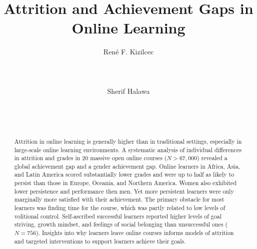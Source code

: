 \documentclass{sigchi}\usepackage[]{graphicx}\usepackage[]{color}
\begin{document}
\title{Attrition and Achievement Gaps in Online Learning}

\author{
  \alignauthor Ren\'{e} F. Kizilcec\\
    \\
    \\
    \\
  \alignauthor Sherif Halawa\\
    \\
    \\
    \\
}

\maketitle

\begin{abstract}
Attrition in online learning is generally higher than in traditional settings, especially in large-scale online learning environments. A systematic analysis of individual differences in attrition and grades in 20 massive open online courses ($N>67,000$) revealed a global achievement gap and a gender achievement gap. Online learners in Africa, Asia, and Latin America scored substantially lower grades and were up to half as likely to persist than those in Europe, Oceania, and Northern America. Women also exhibited lower persistence and performance then men. Yet more persistent learners were only marginally more satisfied with their achievement. The primary obstacle for most learners was finding time for the course, which was partly related to low levels of volitional control. Self-ascribed successful learners reported higher levels of goal striving, growth mindset, and feelings of social belonging than unsuccessful ones ($N=756$). 
Insights into why learners leave online courses informs models of attrition and targeted interventions to support learners achieve their goals.
\end{abstract}


\end{document}
